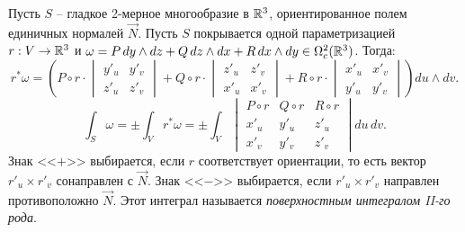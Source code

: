 \begin{example}
    Пусть $S$ -- гладкое 2-мерное многообразие в $\mathbb{R}^3$, ориентированное полем единичных нормалей $\vec{N}$.
    Пусть $S$ покрывается одной параметризацией $r: V \to \mathbb{R}^3$ и $\omega = P\, dy \wedge dz + Q\, dz \wedge dx + R\, dx \wedge dy \in \Omega_c^2(\mathbb{R}^3)$. 
    Тогда:
    \[
    r^*\omega = \left( P \circ r \cdot \begin{vmatrix} y'_u & y'_v \\ z'_u & z'_v \end{vmatrix} + Q \circ r \cdot \begin{vmatrix} z'_u & z'_v \\ x'_u & x'_v \end{vmatrix} + R \circ r \cdot \begin{vmatrix} x'_u & x'_v \\ y'_u & y'_v \end{vmatrix} \right) du \wedge dv.
    \]
    \[
    \int_S \omega = \pm \int_V r^*\omega = \pm \int_V 
    \begin{vmatrix}
    P \circ r & Q \circ r & R \circ r \\
    x'_u & y'_u & z'_u \\
    x'_v & y'_v & z'_v 
    \end{vmatrix}
    du\, dv.
    \]
    Знак <<$+$>> выбирается, если $r$ соответствует ориентации, то есть вектор $r'_u \times r'_v$ сонаправлен с $\vec{N}$.
	Знак <<$-$>> выбирается, если $r'_u \times r'_v$ направлен противоположно $\vec{N}$.
	Этот интеграл называется \textit{поверхностным интегралом II-го рода}.
\end{example}
